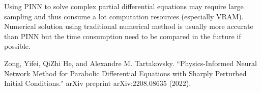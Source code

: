 \documentclass[11pt, a4paper]{article}
\begin{document}
    Using PINN to solve complex partial differential equations may require large sampling and thus consume a lot computation resources (especially VRAM). 
    Numerical solution using traditional numerical method is usually more accurate than PINN but the time consumption need to be compared in the furture if possible. 

    \begin{thebibliography}{9}
           Zong, Yifei, QiZhi He, and Alexandre M. Tartakovsky. ``Physics-Informed Neural Network Method for Parabolic Differential Equations with Sharply Perturbed Initial Conditions." arXiv preprint arXiv:2208.08635 (2022).
    \end{thebibliography}
\end{document}
